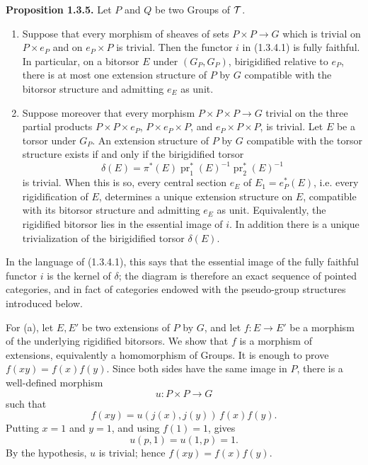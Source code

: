 \documentclass[11pt]{article}
\providecommand{\pr}{\operatorname{pr}}
\begin{document}
\textbf{Proposition 1.3.5.}  Let \(P\) and \(Q\) be two Groups of \(\mathcal T\).
\begin{enumerate}[label=\alph*)]
\item Suppose that every morphism of sheaves of sets \(P\times P\to G\) which is trivial on \(P\times e_P\) and on \(e_P\times P\) is trivial.  Then the functor \(i\) in (1.3.4.1) is fully faithful.  In particular, on a bitorsor \(E\) under \((G_P,G_P)\), birigidified relative to \(e_P\), there is at most one extension structure of \(P\) by \(G\) compatible with the bitorsor structure and admitting \(e_E\) as unit.
\item Suppose moreover that every morphism \(P\times P\times P\to G\) trivial on the three partial products \(P\times P\times e_P\), \(P\times e_P\times P\), and \(e_P\times P\times P\), is trivial.  Let \(E\) be a torsor under \(G_P\).  An extension structure of \(P\) by \(G\) compatible with the torsor structure exists if and only if the birigidified torsor
\[
  \delta(E)=\pi^*(E)\pr_1^*(E)^{-1}\pr_2^*(E)^{-1}
\]
is trivial.  When this is so, every central section \(e_E\) of \(E_1=e_P^*(E)\), i.e. every rigidification of \(E\), determines a unique extension structure on \(E\), compatible with its bitorsor structure and admitting \(e_E\) as unit.  Equivalently, the rigidified bitorsor lies in the essential image of \(i\).  In addition there is a unique trivialization of the birigidified torsor \(\delta(E)\).
\end{enumerate}

In the language of (1.3.4.1), this says that the essential image of the fully faithful functor \(i\) is the kernel of \(\delta\); the diagram is therefore an exact sequence of pointed categories, and in fact of categories endowed with the pseudo-group structures introduced below.

For (a), let \(E,E'\) be two extensions of \(P\) by \(G\), and let \(f:E\to E'\) be a morphism of the underlying rigidified bitorsors.  We show that \(f\) is a morphism of extensions, equivalently a homomorphism of Groups.  It is enough to prove \(f(xy)=f(x)f(y)\).  Since both sides have the same image in \(P\), there is a well-defined morphism
\[
  u:P\times P\longrightarrow G
\]
such that
\[
  f(xy)=u(j(x),j(y))\,f(x)f(y).
\]
Putting \(x=1\) and \(y=1\), and using \(f(1)=1\), gives
\[
  u(p,1)=u(1,p)=1.
\]
By the hypothesis, \(u\) is trivial; hence \(f(xy)=f(x)f(y)\).
\end{document}
